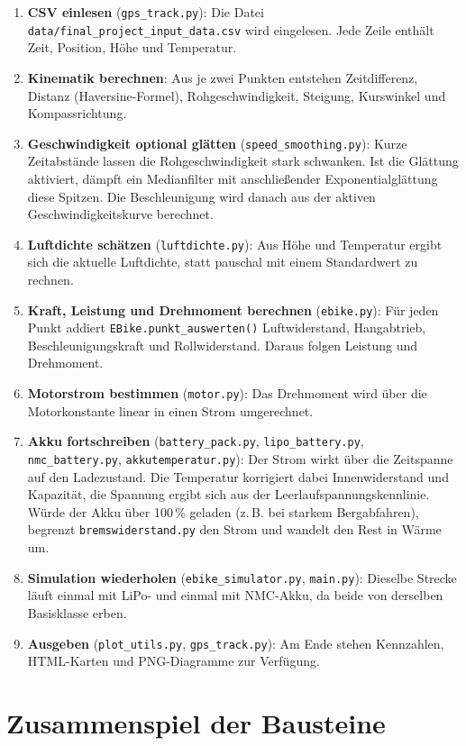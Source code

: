 \begin{enumerate}
  \item \textbf{CSV einlesen} (\texttt{gps\_track.py}): Die Datei \texttt{data/final\_project\_input\_data.csv} wird eingelesen. Jede Zeile enthält Zeit, Position, Höhe und Temperatur.
  \item \textbf{Kinematik berechnen}: Aus je zwei Punkten entstehen Zeitdifferenz, Distanz (Haversine-Formel), Rohgeschwindigkeit, Steigung, Kurswinkel und Kompassrichtung.
  \item \textbf{Geschwindigkeit optional glätten} (\texttt{speed\_smoothing.py}): Kurze Zeitabstände lassen die Rohgeschwindigkeit stark schwanken. Ist die Glättung aktiviert, dämpft ein Medianfilter mit anschließender Exponentialglättung diese Spitzen. Die Beschleunigung wird danach aus der aktiven Geschwindigkeitskurve berechnet.
  \item \textbf{Luftdichte schätzen} (\texttt{luftdichte.py}): Aus Höhe und Temperatur ergibt sich die aktuelle Luftdichte, statt pauschal mit einem Standardwert zu rechnen.
  \item \textbf{Kraft, Leistung und Drehmoment berechnen} (\texttt{ebike.py}): Für jeden Punkt addiert \texttt{EBike.punkt\_auswerten()} Luftwiderstand, Hangabtrieb, Beschleunigungskraft und Rollwiderstand. Daraus folgen Leistung und Drehmoment.
  \item \textbf{Motorstrom bestimmen} (\texttt{motor.py}): Das Drehmoment wird über die Motorkonstante linear in einen Strom umgerechnet.
  \item \textbf{Akku fortschreiben} (\texttt{battery\_pack.py}, \texttt{lipo\_battery.py}, \texttt{nmc\_battery.py}, \texttt{akkutemperatur.py}): Der Strom wirkt über die Zeitspanne auf den Ladezustand. Die Temperatur korrigiert dabei Innenwiderstand und Kapazität, die Spannung ergibt sich aus der Leerlaufspannungskennlinie. Würde der Akku über 100\,\% geladen (z.\,B. bei starkem Bergabfahren), begrenzt \texttt{bremswiderstand.py} den Strom und wandelt den Rest in Wärme um.
  \item \textbf{Simulation wiederholen} (\texttt{ebike\_simulator.py}, \texttt{main.py}): Dieselbe Strecke läuft einmal mit LiPo- und einmal mit NMC-Akku, da beide von derselben Basisklasse erben.
  \item \textbf{Ausgeben} (\texttt{plot\_utils.py}, \texttt{gps\_track.py}): Am Ende stehen Kennzahlen, HTML-Karten und PNG-Diagramme zur Verfügung.
\end{enumerate}

\section{Zusammenspiel der Bausteine}

